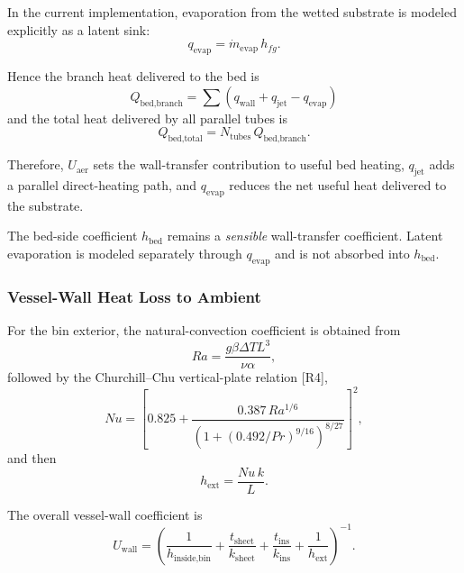 \documentclass{article}
\begin{document}
In the current implementation, evaporation from the wetted substrate is
modeled explicitly as a latent sink:
\begin{equation}
q_{\text{evap}}
=
\dot m_{\text{evap}}\,h_{fg}.
\end{equation}

Hence the branch heat delivered to the bed is
\begin{equation}
Q_{\text{bed,branch}}=\sum \left(q_{\text{wall}}+q_{\text{jet}}-q_{\text{evap}}\right)
\end{equation}
and the total heat delivered by all parallel tubes is
\begin{equation}
Q_{\text{bed,total}}=N_{\text{tubes}}\,Q_{\text{bed,branch}}.
\end{equation}

Therefore, $U_{\text{aer}}$ sets the wall-transfer contribution to useful bed
heating, $q_{\text{jet}}$ adds a parallel direct-heating path, and
$q_{\text{evap}}$ reduces the net useful heat delivered to the substrate.

The bed-side coefficient $h_{\text{bed}}$ remains a \emph{sensible}
wall-transfer coefficient. Latent evaporation is modeled separately through
$q_{\text{evap}}$ and is not absorbed into $h_{\text{bed}}$.

\subsubsection{Vessel-Wall Heat Loss to Ambient}

For the bin exterior, the natural-convection coefficient is obtained from
\begin{equation}
Ra=\frac{g\beta\Delta T L^3}{\nu\alpha},
\end{equation}
followed by the Churchill--Chu vertical-plate relation [R4],
\begin{equation}
Nu
=
\left[
0.825+
\frac{0.387\,Ra^{1/6}}
{\left(1+(0.492/Pr)^{9/16}\right)^{8/27}}
\right]^2,
\end{equation}
and then
\begin{equation}
h_{\text{ext}}=\frac{Nu\,k}{L}.
\end{equation}

The overall vessel-wall coefficient is
\begin{equation}
U_{\text{wall}}
=
\left(
\frac{1}{h_{\text{inside,bin}}}
+\frac{t_{\text{sheet}}}{k_{\text{sheet}}}
+\frac{t_{\text{ins}}}{k_{\text{ins}}}
+\frac{1}{h_{\text{ext}}}
\right)^{-1}.
\end{equation}
\end{document}

